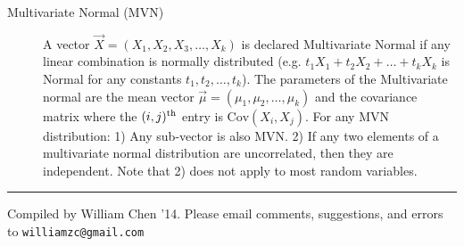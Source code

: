 \documentclass[10pt,landscape]{article}
\theoremstyle{definition}
\newcommand{\cov}{\textrm{Cov}}
\begin{document}
\begin{multicols}{3}
\begin{description}
\item[Multivariate Normal (MVN)]
A vector $\vec{X} = (X_1, X_2, X_3, \dots, X_k)$ is declared Multivariate Normal if any linear combination is normally distributed (e.g. $t_1X_1 + t_2X_2 + \dots + t_kX_k$ is Normal for any constants $t_1, t_2, \dots, t_k$). The parameters of the Multivariate normal are the mean vector $\vec{\mu} = (\mu_1, \mu_2, \dots, \mu_k)$ and the covariance matrix where the $(i, j)^{\textnormal{th}}$ entry is $\cov(X_i, X_j)$. For any MVN distribution: 1) Any sub-vector is also MVN. 2) If any two elements of a multivariate normal distribution are uncorrelated, then they are independent. Note that 2) does not apply to most random variables. 

\end{description}






\rule{0.3\linewidth}{0.25pt}
\scriptsize

Compiled by William Chen '14. Please email comments, suggestions, and errors to \texttt{williamzc@gmail.com}


\end{multicols}
\end{document}
